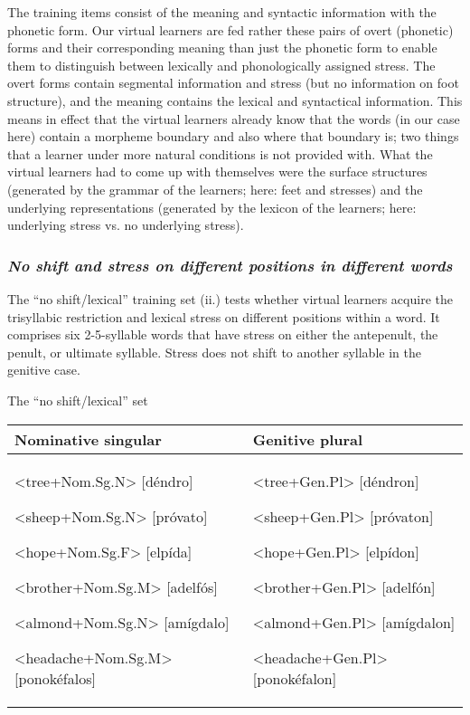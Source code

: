 \documentclass[a4paper]{article}
\begin{document}
The training items consist of the meaning and syntactic information with the phonetic form. Our virtual learners are fed rather these pairs of overt (phonetic) forms and their corresponding meaning than just the phonetic form to enable them to distinguish between lexically and phonologically assigned stress. The overt forms contain segmental information and stress (but no information on foot structure), and the meaning contains the lexical and syntactical information. This means in effect that the virtual learners already know that the words (in our case here) contain a morpheme boundary and also where that boundary is; two things that a learner under more natural conditions is not provided with. What the virtual learners had to come up with themselves were the surface structures (generated by the grammar of the learners; here: feet and stresses) and the underlying representations (generated by the lexicon of the learners; here: underlying stress vs. no underlying stress).

\subsubsection{ \textit{No shift}\textit{ and stress on different positions in different words}}

The “no shift/lexical” training set (ii.) tests whether virtual learners acquire the trisyllabic restriction and lexical stress on different positions within a word. It comprises six 2-5-syllable words that have stress on either the antepenult, the penult, or ultimate syllable. Stress does not shift to another syllable in the genitive case.


\ea The “no shift/lexical” set

\begin{center}
\tablehead{}
\begin{supertabular}{m{2.68096in}|m{2.41706in}}
 Nominative singular &
 Genitive plural\\\hline
{ {\textless}tree+Nom.Sg.N{\textgreater} [déndro] \ \ }

{ {\textless}sheep+Nom.Sg.N{\textgreater} [próvato] }

{ {\textless}hope+Nom.Sg.F{\textgreater} [elpída] }

{ {\textless}brother+Nom.Sg.M{\textgreater} [adelfós] }

{ {\textless}almond+Nom.Sg.N{\textgreater} [amígdalo] }

 {\textless}headache+Nom.Sg.M{\textgreater} [ponokéfalos]  &
{ {\textless}tree+Gen.Pl{\textgreater} [déndron] \ \ }

{ {\textless}sheep+Gen.Pl{\textgreater} [próvaton] }

{ {\textless}hope+Gen.Pl{\textgreater} [elpídon] }

{ {\textless}brother+Gen.Pl{\textgreater} [adelfón] }

{ {\textless}almond+Gen.Pl{\textgreater} [amígdalon] }

 {\textless}headache+Gen.Pl{\textgreater} [ponokéfalon] \\
\end{supertabular}
\end{center}
\z
\end{document}

